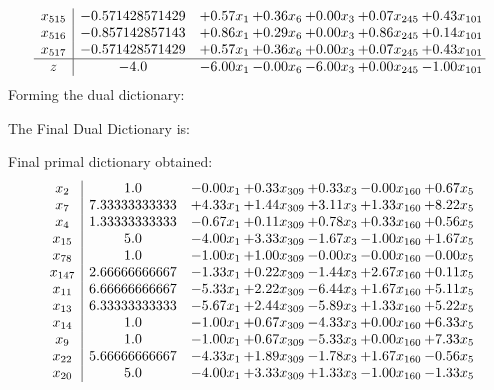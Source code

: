 \documentclass[8pt]{article}
\begin{document}
\[\begin{array}{c| c c@{\hskip 2pt} c@{\hskip 2pt} c@{\hskip 2pt} c@{\hskip 2pt} c@{\hskip 2pt} }
 x_{515}   &  -0.571428571429 & +  0.57 x_{1} & +  0.36 x_{6} & +  0.00 x_{3} & +  0.07 x_{245} & +  0.43 x_{101}\\
 x_{516}   &  -0.857142857143 & +  0.86 x_{1} & +  0.29 x_{6} & +  0.00 x_{3} & +  0.86 x_{245} & +  0.14 x_{101}\\
 x_{517}   &  -0.571428571429 & +  0.57 x_{1} & +  0.36 x_{6} & +  0.00 x_{3} & +  0.07 x_{245} & +  0.43 x_{101}\\
\hline
z    &  -4.0 & -6.00 x_{1} & -0.00 x_{6} & -6.00 x_{3} & +  0.00 x_{245} & -1.00 x_{101}\\
\end{array}\]
Forming the dual dictionary:

The Final Dual Dictionary is: 

 Final primal dictionary obtained: 
\[\begin{array}{c| c c@{\hskip 2pt} c@{\hskip 2pt} c@{\hskip 2pt} c@{\hskip 2pt} c@{\hskip 2pt} }
 x_{2}   &  1.0 & -0.00 x_{1} & +  0.33 x_{309} & +  0.33 x_{3} & -0.00 x_{160} & +  0.67 x_{5}\\
 x_{7}   &  7.33333333333 & +  4.33 x_{1} & +  1.44 x_{309} & +  3.11 x_{3} & +  1.33 x_{160} & +  8.22 x_{5}\\
 x_{4}   &  1.33333333333 & -0.67 x_{1} & +  0.11 x_{309} & +  0.78 x_{3} & +  0.33 x_{160} & +  0.56 x_{5}\\
 x_{15}   &  5.0 & -4.00 x_{1} & +  3.33 x_{309} & -1.67 x_{3} & -1.00 x_{160} & +  1.67 x_{5}\\
 x_{78}   &  1.0 & -1.00 x_{1} & +  1.00 x_{309} & -0.00 x_{3} & -0.00 x_{160} & -0.00 x_{5}\\
 x_{147}   &  2.66666666667 & -1.33 x_{1} & +  0.22 x_{309} & -1.44 x_{3} & +  2.67 x_{160} & +  0.11 x_{5}\\
 x_{11}   &  6.66666666667 & -5.33 x_{1} & +  2.22 x_{309} & -6.44 x_{3} & +  1.67 x_{160} & +  5.11 x_{5}\\
 x_{13}   &  6.33333333333 & -5.67 x_{1} & +  2.44 x_{309} & -5.89 x_{3} & +  1.33 x_{160} & +  5.22 x_{5}\\
 x_{14}   &  1.0 & -1.00 x_{1} & +  0.67 x_{309} & -4.33 x_{3} & +  0.00 x_{160} & +  6.33 x_{5}\\
 x_{9}   &  1.0 & -1.00 x_{1} & +  0.67 x_{309} & -5.33 x_{3} & +  0.00 x_{160} & +  7.33 x_{5}\\
 x_{22}   &  5.66666666667 & -4.33 x_{1} & +  1.89 x_{309} & -1.78 x_{3} & +  1.67 x_{160} & -0.56 x_{5}\\
 x_{20}   &  5.0 & -4.00 x_{1} & +  3.33 x_{309} & +  1.33 x_{3} & -1.00 x_{160} & -1.33 x_{5}\\

\end{array}\]
\end{document}
